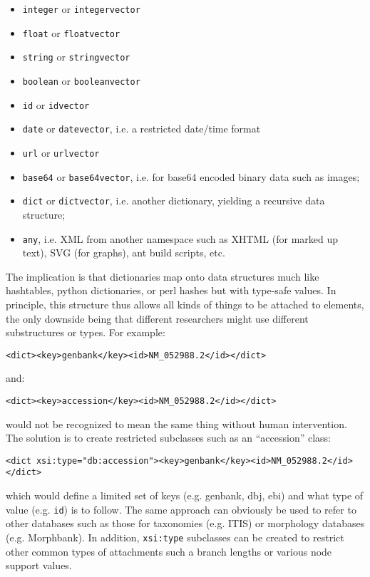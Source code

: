 \documentclass{article}
\newcommand{\code}{\texttt}
\begin{document}
\begin{itemize}

\item \code{integer} or \code{integervector}

\item \code{float} or \code{floatvector}

\item \code{string} or \code{stringvector}

\item \code{boolean} or \code{booleanvector}

\item \code{id} or \code{idvector}

\item \code{date} or \code{datevector}, i.e. a restricted date/time format

\item \code{url} or \code{urlvector}

\item \code{base64} or \code{base64vector}, i.e. for base64 encoded binary data such as images;

\item \code{dict} or \code{dictvector}, i.e. another dictionary, yielding a recursive data structure;

\item \code{any}, i.e. XML from another namespace such as XHTML (for marked up text), SVG (for graphs), ant build scripts, etc.

\end{itemize}

The implication is that dictionaries map onto data structures much like hashtables, python dictionaries, or perl hashes but with 
type-safe values. In principle, this structure thus allows all kinds of things to be attached to elements, the only downside 
being that different researchers might use different substructures or types. For example:
\begin{verbatim}
<dict><key>genbank</key><id>NM_052988.2</id></dict>
\end{verbatim}
and:
\begin{verbatim}
<dict><key>accession</key><id>NM_052988.2</id></dict>
\end{verbatim}
would not be recognized to mean the same thing without human intervention. The solution is to create restricted subclasses such as 
an ``accession'' class:
\begin{verbatim}
<dict xsi:type="db:accession"><key>genbank</key><id>NM_052988.2</id></dict>
\end{verbatim}
which would define a limited set of keys (e.g. genbank, dbj, ebi) and what type of value (e.g. \code{id}) is to follow. The 
same approach can obviously be used to refer to other databases such as those for taxonomies (e.g. ITIS) or morphology databases 
(e.g. Morphbank). In addition, \code{xsi:type} subclasses can be created to restrict other common types of attachments such 
a branch lengths or various node support values.
\end{document}
